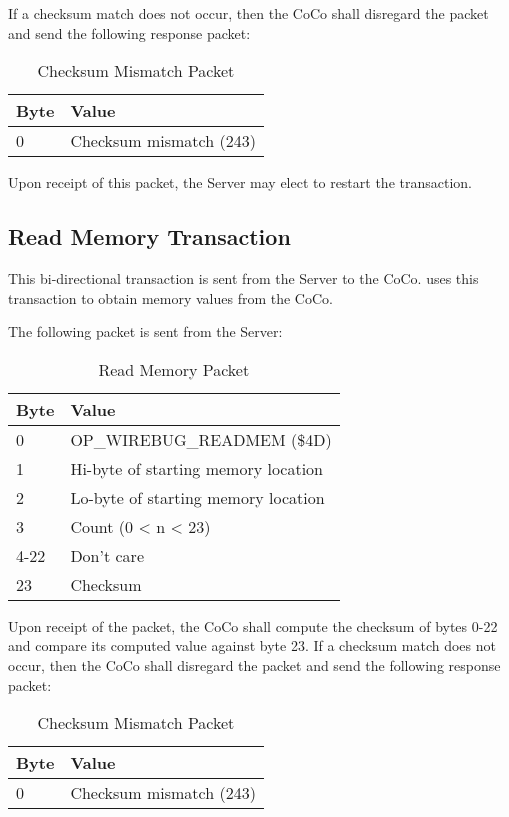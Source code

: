 \documentclass{article}
\begin{document}
If a checksum match does not occur, then the CoCo shall disregard the packet and send the following response packet:

\begin{table}[ht]
\caption{Checksum Mismatch Packet}
\begin{center}
\begin{tabular}{|ll|}
\hline
Byte & Value \\ \hline
0 & Checksum mismatch (243) \\
\hline
\end{tabular}
\end{center}
\end{table}

Upon receipt of this packet, the Server may elect to restart the transaction.

\clearpage
\subsection{Read Memory Transaction}
This bi-directional transaction is sent from the Server to the CoCo. uses this transaction to obtain memory values from the CoCo.

The following packet is sent from the Server:

\begin{table}[ht]
\caption{Read Memory Packet}
\begin{center}
\begin{tabular}{|ll|}
\hline
Byte & Value \\ \hline
0 & OP\_WIREBUG\_READMEM (\$4D) \\
1 & Hi-byte of starting memory location \\
2 & Lo-byte of starting memory location \\
3 & Count (0 < n < 23) \\
4-22 & Don't care \\
23 & Checksum \\
\hline
\end{tabular}
\end{center}
\end{table}

Upon receipt of the packet, the CoCo shall compute the checksum of bytes 0-22 and compare its computed value against byte 23. If a checksum match does not occur, then the CoCo shall disregard the packet and send the following response packet:

\begin{table}[ht]
\caption{Checksum Mismatch Packet}
\begin{center}
\begin{tabular}{|ll|}
\hline
Byte & Value \\ \hline
0 & Checksum mismatch (243) \\
\hline
\end{tabular}
\end{center}
\end{table}
\end{document}
